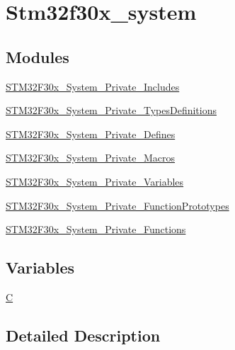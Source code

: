 \hypertarget{group__stm32f30x__system}{\section{Stm32f30x\-\_\-system}
\label{group__stm32f30x__system}
}
\subsection*{Modules}
\begin{DoxyCompactItemize}
\item 
\hyperlink{group___s_t_m32_f30x___system___private___includes}{S\-T\-M32\-F30x\-\_\-\-System\-\_\-\-Private\-\_\-\-Includes}
\item 
\hyperlink{group___s_t_m32_f30x___system___private___types_definitions}{S\-T\-M32\-F30x\-\_\-\-System\-\_\-\-Private\-\_\-\-Types\-Definitions}
\item 
\hyperlink{group___s_t_m32_f30x___system___private___defines}{S\-T\-M32\-F30x\-\_\-\-System\-\_\-\-Private\-\_\-\-Defines}
\item 
\hyperlink{group___s_t_m32_f30x___system___private___macros}{S\-T\-M32\-F30x\-\_\-\-System\-\_\-\-Private\-\_\-\-Macros}
\item 
\hyperlink{group___s_t_m32_f30x___system___private___variables}{S\-T\-M32\-F30x\-\_\-\-System\-\_\-\-Private\-\_\-\-Variables}
\item 
\hyperlink{group___s_t_m32_f30x___system___private___function_prototypes}{S\-T\-M32\-F30x\-\_\-\-System\-\_\-\-Private\-\_\-\-Function\-Prototypes}
\item 
\hyperlink{group___s_t_m32_f30x___system___private___functions}{S\-T\-M32\-F30x\-\_\-\-System\-\_\-\-Private\-\_\-\-Functions}
\end{DoxyCompactItemize}
\subsection*{Variables}
\begin{DoxyCompactItemize}
\item 
\hyperlink{group__stm32f30x__system_gaaa53ca0b650dfd85c4f59fa156f7a2cc}{C}
\end{DoxyCompactItemize}


\subsection{Detailed Description}



